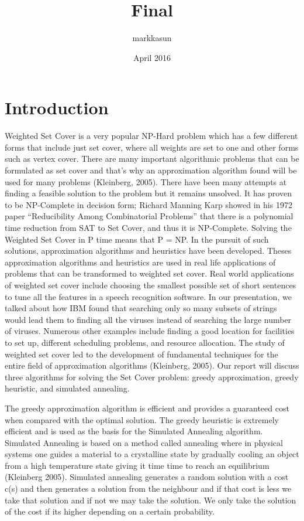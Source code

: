 \documentclass{report}
\title{Final}
\author{markkasun }
\date{April 2016}
\begin{document}
\section{Introduction}
Weighted Set Cover is a very popular NP-Hard problem which has a few different forms that include just set cover, where all weights are set to one and other forms such as vertex cover. There are many important algorithmic problems that can be formulated as set cover and that’s why an approximation algorithm found will be used for many problems (Kleinberg, 2005). There have been many attempts at finding a feasible solution to the problem but it remains unsolved. It has proven to be NP-Complete in decision form; Richard Manning Karp showed in his 1972 paper “Reducibility Among Combinatorial Problems” that there is a polynomial time reduction from SAT to Set Cover, and thus it is NP-Complete. Solving the Weighted Set Cover in P time means that P = NP. In the pursuit of such solutions, approximation algorithms and heuristics have been developed. Theses approximation algorithms and heuristics are used in real life applications of problems that can be transformed to weighted set cover. Real world applications of weighted set cover include choosing the smallest possible set of short sentences to tune all the features in a speech recognition software. In our presentation, we talked about how IBM found that searching only so many subsets of strings would lead them to finding all the viruses instead of searching the large number of viruses. Numerous other examples include finding a good location for facilities to set up, different scheduling problems, and resource allocation. The study of weighted set cover led to the development of fundamental techniques for the entire field of approximation algorithms (Kleinberg, 2005). Our report will discuss three algorithms for solving the Set Cover problem: greedy approximation, greedy heuristic, and simulated annealing.

The greedy approximation algorithm is efficient and provides a guaranteed cost when compared with the optimal solution. The greedy heuristic is extremely efficient and is used as the basis for the Simulated Annealing algorithm. Simulated Annealing is based on a method called annealing where in physical systems one guides a material to a crystalline state by gradually cooling an object from a high temperature state giving it time time to reach an equilibrium (Kleinberg 2005). Simulated annealing generates a random solution with a cost c(s) and then generates a solution from the neighbour and if that cost is less we take that solution and if not we may take the solution. We only take the solution of the cost if its higher depending on a certain probability.
\end{document}
